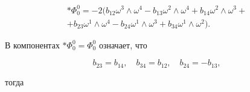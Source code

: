 






\begin{multline*}

\ast \Phi _{0}^{0}=-2\bigl( 


b_{12}\omega ^{3}\wedge \omega ^{4}-b_{13}\omega ^{2}\wedge \omega

^{4}+b_{14}\omega ^{2}\wedge \omega ^{3}+ \\ 

+b_{23}\omega ^{1}\wedge \omega ^{4}-b_{24}\omega ^{1}\wedge \omega

^{3}+b_{34}\omega ^{1}\wedge \omega ^{2}


\bigr) .

\end{multline*}

В компонентах $\ast \Phi _{0}^{0}=\Phi _{0}^{0}$ означает, что

\begin{equation}

b_{23}=b_{14},\quad b_{34}=b_{12},\quad b_{24}=-b_{13},  \label{kriv:209}

\end{equation}

тогда






